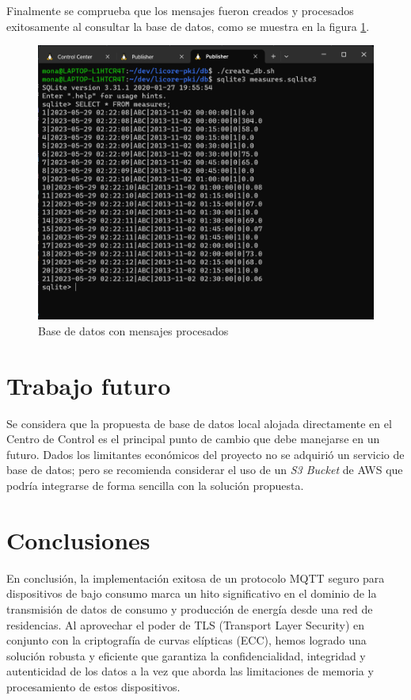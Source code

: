 \documentclass{article}
\begin{document}
        Finalmente se comprueba que los mensajes fueron creados y procesados exitosamente al consultar la base de datos, como se muestra en la figura \ref{fig:db}.
        \begin{figure}[!htbp]
            \centering
            \includegraphics[scale=0.5]{database.png}
            \caption{Base de datos con mensajes procesados}
            \label{fig:db}
        \end{figure}

    \section{Trabajo futuro}

        Se considera que la propuesta de base de datos local alojada directamente en el Centro de Control es el principal punto de cambio que debe manejarse en un futuro. Dados los limitantes económicos del proyecto no se adquirió un servicio de base de datos; pero se recomienda considerar el uso de un \textit{S3 Bucket} de AWS que podría integrarse de forma sencilla con la solución propuesta.

    \section{Conclusiones} \label{sec:conclusions}

        En conclusión, la implementación exitosa de un protocolo MQTT seguro para dispositivos de bajo consumo marca un hito significativo en el dominio de la transmisión de datos de consumo y producción de energía desde una red de residencias. Al aprovechar el poder de TLS (Transport Layer Security) en conjunto con la criptografía de curvas elípticas (ECC), hemos logrado una solución robusta y eficiente que garantiza la confidencialidad, integridad y autenticidad de los datos a la vez que aborda las limitaciones de memoria y procesamiento de estos dispositivos.
\end{document}
